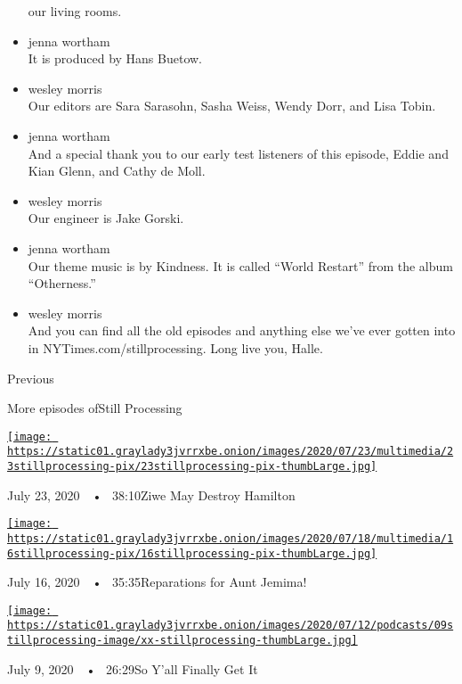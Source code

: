 \begin{itemize}
  our living rooms.
\item
  jenna wortham\\
  It is produced by Hans Buetow.
\item
  wesley morris\\
  Our editors are Sara Sarasohn, Sasha Weiss, Wendy Dorr, and Lisa
  Tobin.
\item
  jenna wortham\\
  And a special thank you to our early test listeners of this episode,
  Eddie and Kian Glenn, and Cathy de Moll.
\item
  wesley morris\\
  Our engineer is Jake Gorski.
\item
  jenna wortham\\
  Our theme music is by Kindness. It is called ``World Restart'' from
  the album ``Otherness.''
\item
  wesley morris\\
  And you can find all the old episodes and anything else we've ever
  gotten into in NYTimes.com/stillprocessing. Long live you, Halle.
\end{itemize}

Previous

More episodes ofStill Processing

\href{https://www.nytimes3xbfgragh.onion/2020/07/23/podcasts/hamilton-ziwe-discomfort.html?action=click\&module=audio-series-bar\&region=header\&pgtype=Article}{\texttt{[image: https://static01.graylady3jvrrxbe.onion/images/2020/07/23/multimedia/23stillprocessing-pix/23stillprocessing-pix-thumbLarge.jpg]}}

July 23, 2020~~•~ 38:10Ziwe May Destroy Hamilton

\href{https://www.nytimes3xbfgragh.onion/2020/07/16/podcasts/reparations-for-aunt-jemima.html?action=click\&module=audio-series-bar\&region=header\&pgtype=Article}{\texttt{[image: https://static01.graylady3jvrrxbe.onion/images/2020/07/18/multimedia/16stillprocessing-pix/16stillprocessing-pix-thumbLarge.jpg]}}

July 16, 2020~~•~ 35:35Reparations for Aunt Jemima!

\href{https://www.nytimes3xbfgragh.onion/2020/07/09/podcasts/still-processing-black-lives-matter.html?action=click\&module=audio-series-bar\&region=header\&pgtype=Article}{\texttt{[image: https://static01.graylady3jvrrxbe.onion/images/2020/07/12/podcasts/09stillprocessing-image/xx-stillprocessing-thumbLarge.jpg]}}

July 9, 2020~~•~ 26:29So Y'all Finally Get It

